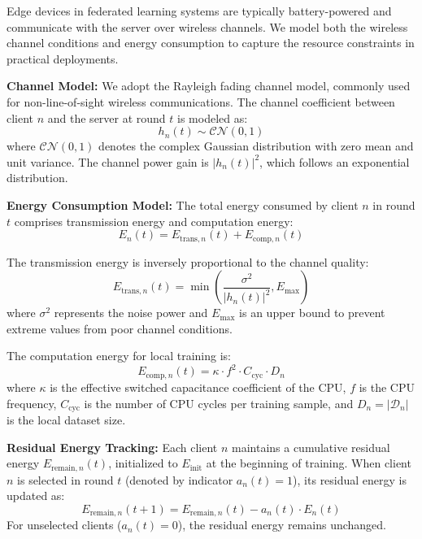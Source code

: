 Edge devices in federated learning systems are typically battery-powered and communicate with the server over wireless channels. We model both the wireless channel conditions and energy consumption to capture the resource constraints in practical deployments.

\textbf{Channel Model:} We adopt the Rayleigh fading channel model, commonly used for non-line-of-sight wireless communications. The channel coefficient between client $n$ and the server at round $t$ is modeled as:
\begin{equation}
h_n(t) \sim \mathcal{CN}(0, 1)
\end{equation}
where $\mathcal{CN}(0, 1)$ denotes the complex Gaussian distribution with zero mean and unit variance. The channel power gain is $|h_n(t)|^2$, which follows an exponential distribution.

\textbf{Energy Consumption Model:} The total energy consumed by client $n$ in round $t$ comprises transmission energy and computation energy:
\begin{equation}
E_n(t) = E_{\text{trans},n}(t) + E_{\text{comp},n}(t)
\end{equation}

The transmission energy is inversely proportional to the channel quality:
\begin{equation}
E_{\text{trans},n}(t) = \min\left(\frac{\sigma^2}{|h_n(t)|^2}, E_{\max}\right)
\end{equation}
where $\sigma^2$ represents the noise power and $E_{\max}$ is an upper bound to prevent extreme values from poor channel conditions.

The computation energy for local training is:
\begin{equation}
E_{\text{comp},n}(t) = \kappa \cdot f^2 \cdot C_{\text{cyc}} \cdot D_n
\end{equation}
where $\kappa$ is the effective switched capacitance coefficient of the CPU, $f$ is the CPU frequency, $C_{\text{cyc}}$ is the number of CPU cycles per training sample, and $D_n = |\mathcal{D}_n|$ is the local dataset size.

\textbf{Residual Energy Tracking:} Each client $n$ maintains a cumulative residual energy $E_{\text{remain},n}(t)$, initialized to $E_{\text{init}}$ at the beginning of training. When client $n$ is selected in round $t$ (denoted by indicator $a_n(t) = 1$), its residual energy is updated as:
\begin{equation}
E_{\text{remain},n}(t+1) = E_{\text{remain},n}(t) - a_n(t) \cdot E_n(t)
\end{equation}
For unselected clients ($a_n(t) = 0$), the residual energy remains unchanged.

